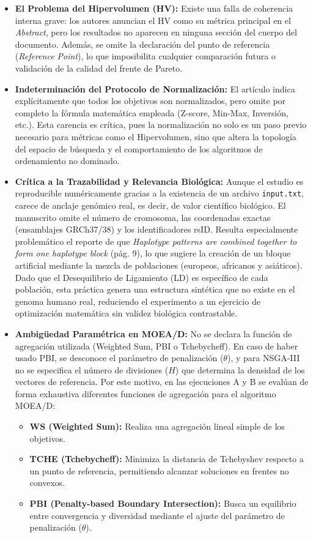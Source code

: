 \documentclass[a4paper,10pt]{article} %
\begin{document}
\begin{itemize}
    \item \textbf{El Problema del Hipervolumen (HV):} Existe una falla de coherencia interna grave: los autores anuncian el HV como su métrica principal en el \textit{Abstract}, pero los resultados no aparecen en ninguna sección del cuerpo del documento. Además, se omite la declaración del punto de referencia (\textit{Reference Point}), lo que imposibilita cualquier comparación futura o validación de la calidad del frente de Pareto.
    \item \textbf{Indeterminación del Protocolo de Normalización:} El artículo indica explícitamente que \guillemotleft todos los objetivos son normalizados\guillemotright, pero omite por completo la fórmula matemática empleada (Z-score, Min-Max, Inversión, etc.). Esta carencia es crítica, pues la normalización no solo es un paso previo necesario para métricas como el Hipervolumen, sino que altera la topología del espacio de búsqueda y el comportamiento de los algoritmos de ordenamiento no dominado.
    \item \textbf{Crítica a la Trazabilidad y Relevancia Biológica:} Aunque el estudio es reproducible numéricamente gracias a la existencia de un archivo \texttt{input.txt}, carece de anclaje genómico real, es decir, de valor científico biológico. El manuscrito omite el número de cromosoma, las coordenadas exactas (ensamblajes GRCh37/38) y los identificadores rsID. Resulta especialmente problemático el reporte de que \textit{\guillemotleft Haplotype patterns are combined together to form one haplotype block\guillemotright} (pág. 9), lo que sugiere la creación de un bloque artificial mediante la mezcla de poblaciones (europeos, africanos y asiáticos). Dado que el Desequilibrio de Ligamiento (LD) es específico de cada población, esta práctica genera una estructura sintética que no existe en el genoma humano real, reduciendo el experimento a un ejercicio de optimización matemática sin validez biológica contrastable.
    \item \textbf{Ambigüedad Paramétrica en MOEA/D:} No se declara la función de agregación utilizada (Weighted Sum, PBI o Tchebycheff). En caso de haber usado PBI, se desconoce el parámetro de penalización ($\theta$), y para NSGA-III no se especifica el número de divisiones ($H$) que determina la densidad de los vectores de referencia.
    Por este motivo, en las ejecuciones A y B se evalúan de forma exhaustiva diferentes funciones de agregación para el algoritmo MOEA/D: 
    \begin{itemize}
        \item \textbf{WS (Weighted Sum):} Realiza una agregación lineal simple de los objetivos.
        \item \textbf{TCHE (Tchebycheff):} Minimiza la distancia de Tchebyshev respecto a un punto de referencia, permitiendo alcanzar soluciones en frentes no convexos.
        \item \textbf{PBI (Penalty-based Boundary Intersection):} Busca un equilibrio entre convergencia y diversidad mediante el ajuste del parámetro de penalización ($\theta$).
    \end{itemize}
\end{itemize}
\end{document}
